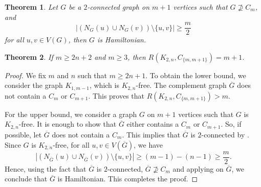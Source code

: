 \documentclass[10pt,a4paper]{amsart}
\newtheorem{theorem}{Theorem}
\begin{document}
\begin{theorem}\label{Hamiltonian lemma}
    Let $G$ be a $2$-connected graph on $m+1$ vertices such that $ G\nsupseteq C_{m}$, and
    \begin{equation*}
        |(N_{G}(u)\cup N_{G}(v))\setminus\{u,v\}|\geq \frac{m}{2}
    \end{equation*}
    for all $u,v\in V(G)$, then $G$ is Hamiltonian. 
\end{theorem}

\begin{theorem}
    If $m\geq 2n+2$ and $m\geq 3$, then $R(K_{2,n},C_{\{m,m+1\}})=m+1$.
\end{theorem}

\begin{proof}
We fix $m$ and $n$ such that $m\geq 2n+1$. To obtain the lower bound, we consider the graph $K_{1,m-1}$, which is $K_{2,n}$-free. The complement graph $\overline{G}$ does not contain a $C_{m}$ or $C_{m+1}$. This proves that $R(K_{2,n},C_{\{m,m+1\}})>m$. 

    For the upper bound, we consider a graph $G$ on $m+1$ vertices such that $G$ is $K_{2,n}$-free. It is enough to show that $\overline{G}$ either contains a $C_{m}$ or $C_{m+1}$. So, if possible, let $\overline{G}$ does not contain a $C_{m}$. This implies that $\overline{G}$ is $2$-connected by . Since $G$ is $K_{2,n}$-free, for all $u,v\in V(\overline{G})$, we have
    \begin{equation*}
        |(N_{\overline{G}}(u)\cup N_{\overline{G}}(v))\setminus\{u,v\}|\geq (m-1)-(n-1)\geq \frac{m}{2}.
    \end{equation*}
     Hence, using the fact that $\overline{G}$ is $2$-connected, $ \overline{G}\nsupseteq C_{m}$ and applying  on $\overline{G}$, we conclude that $\overline{G}$ is Hamiltonian. This completes the proof.
\end{proof}
\end{document}
